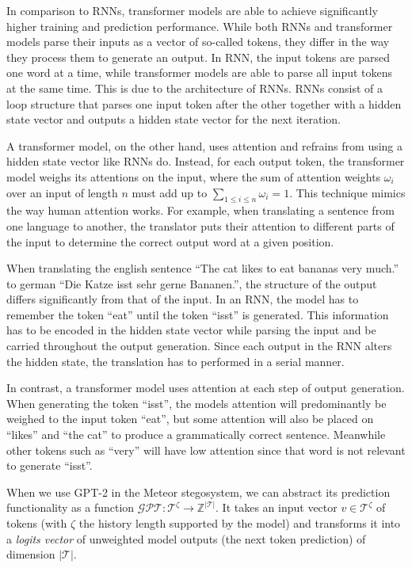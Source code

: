 In comparison to RNNs, transformer models are able to achieve significantly higher training and prediction performance.
While both RNNs and transformer models parse their inputs as a vector of so-called tokens, they differ in the way they process them to generate an output.
In RNN, the input tokens are parsed one word at a time, while transformer models are able to parse all input tokens at the same time.
This is due to the architecture of RNNs.
RNNs consist of a loop structure that parses one input token after the other together with a hidden state vector and outputs a hidden state vector for the next iteration.

A transformer model, on the other hand, uses attention and refrains from using a hidden state vector like RNNs do.
Instead, for each output token, the transformer model weighs its attentions on the input, where the sum of attention weights $\omega_i$ over an input of length $n$ must add up to $\sum_{1\leq i \leq n} \omega_i = 1$.
This technique mimics the way human attention works.
For example, when translating a sentence from one language to another, the translator puts their attention to different parts of the input to determine the correct output word at a given position.

\begin{example}
  When translating the english sentence ``The cat likes to eat bananas very much.'' to german ``Die Katze isst sehr gerne Bananen.'', the structure of the output differs significantly from that of the input.
  In an RNN, the model has to remember the token ``eat'' until the token ``isst'' is generated.
  This information has to be encoded in the hidden state vector while parsing the input and be carried throughout the output generation.
  Since each output in the RNN alters the hidden state, the translation has to performed in a serial manner.
    
  In contrast, a transformer model uses attention at each step of output generation.
  When generating the token ``isst'', the models attention will predominantly be weighed to the input token ``eat'', but some attention will also be placed on ``likes'' and ``the cat'' to produce a grammatically correct sentence.
  Meanwhile other tokens such as ``very'' will have low attention since that word is not relevant to generate ``isst''.
\end{example}



When we use GPT-2 in the Meteor stegosystem, we can abstract its prediction functionality as a function $\mathcal{GPT} \colon \mathcal{T}^\zeta \rightarrow \mathbb{Z}^{|\mathcal{T}|}$.
It takes an input vector $v \in \mathcal{T}^\zeta$ of tokens (with $\zeta$ the history length supported by the model) and transforms it into a \emph{logits vector} of unweighted model outputs (the next token prediction) of dimension $|\mathcal{T}|$.

